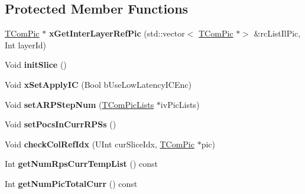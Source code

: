 \subsection*{Protected Member Functions}
\begin{DoxyCompactItemize}
\item 
\mbox{\label{class_t_com_slice_ab6e1a301cf552cdaf1a799a63e3d642f}} 
\hyperlink{class_t_com_pic}{T\+Com\+Pic} $\ast$ {\bfseries x\+Get\+Inter\+Layer\+Ref\+Pic} (std\+::vector$<$ \hyperlink{class_t_com_pic}{T\+Com\+Pic} $\ast$$>$ \&rc\+List\+Il\+Pic, Int layer\+Id)
\end{DoxyCompactItemize}
\begin{DoxyCompactItemize}
\item 
\mbox{\label{class_t_com_slice_a920b8758fc1f7bd2e2e4b9513cee4790}} 
Void {\bfseries init\+Slice} ()
\item 
\mbox{\label{class_t_com_slice_acda8167443744ecb28fb2b693f6d15f5}} 
Void {\bfseries x\+Set\+Apply\+IC} (Bool b\+Use\+Low\+Latency\+I\+C\+Enc)
\item 
\mbox{\label{class_t_com_slice_a2b9cebe6c1d1d816fbc9cf46fadf3a8b}} 
Void {\bfseries set\+A\+R\+P\+Step\+Num} (\hyperlink{class_t_com_pic_lists}{T\+Com\+Pic\+Lists} $\ast$iv\+Pic\+Lists)
\item 
\mbox{\label{class_t_com_slice_a1ab0c1aa7956b324500e92f821821564}} 
Void {\bfseries set\+Pocs\+In\+Curr\+R\+P\+Ss} ()
\item 
\mbox{\label{class_t_com_slice_a13b4e9d7a39afcb75daa789519975f12}} 
Void {\bfseries check\+Col\+Ref\+Idx} (U\+Int cur\+Slice\+Idx, \hyperlink{class_t_com_pic}{T\+Com\+Pic} $\ast$pic)
\item 
\mbox{\label{class_t_com_slice_a45e2a615f86af2347dc33ef5df3ba974}} 
Int {\bfseries get\+Num\+Rps\+Curr\+Temp\+List} () const
\item 
\mbox{\label{class_t_com_slice_aaaeb2bb4ccb488f05636cd90ac4bc75f}} 
Int {\bfseries get\+Num\+Pic\+Total\+Curr} () const
\item 
\mbox{\label{class_t_com_slice_ad731fea578d25390c1f4f884e99ac23b}} 

\end{DoxyCompactItemize}
